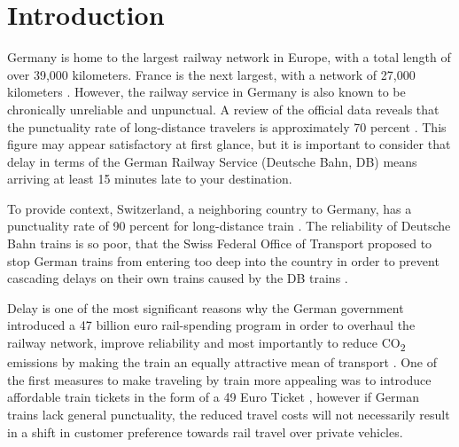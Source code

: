 \documentclass[12pt,a4paper]{article}
\title{\mytitle}
\author{Fabian Becker}
\date{\today}
\begin{document}
    
    
\maketitle

\begin{abstract}
    The goal of this document is to demonstrate how to write a scientific paper. We walk through the process of outlining, writing, formatting in \LaTeX, making figures, referencing, and checking style and content. Source files are available at: \url{http://hoffman.physics.harvard.edu/example-paper/}.
\end{abstract}

\section{\label{sec:Start}Introduction}

Germany is home to the largest railway network in Europe, with a total length of over 39,000 kilometers. France is the next largest, with a network of 27,000 kilometers \citep[p.80]{RailwayLengthStat}. 
However, the railway service in Germany is also known to be chronically unreliable and unpunctual. 
A review of the official data reveals that the punctuality rate of long-distance travelers is approximately 70 percent \citep{dpa2023, DBPunctuality2024}. 
This figure may appear satisfactory at first glance, but it is important to consider that delay in terms of the German Railway Service (Deutsche Bahn, DB) means arriving at least 15 minutes late to your destination.

To provide context, Switzerland, a neighboring country to Germany, has a punctuality rate of 90 percent for long-distance train \citep{SBB2024}. 
The reliability of Deutsche Bahn trains is so poor, that the Swiss Federal Office of Transport proposed to stop German trains from entering too deep into the country in order to prevent cascading delays on their own trains  caused by the DB trains \citep{Magill2023}.

Delay is one of the most significant reasons why the German government introduced a 47 billion euro rail-spending program in order to overhaul the railway network, improve reliability and most importantly to reduce CO\textsubscript{2} emissions by making the train an equally attractive mean of transport \citep{Scally2023}. 
One of the first measures to make traveling by train more appealing was to introduce affordable train tickets in the form of a 49 Euro Ticket \citep{DW2023}, however if German trains lack general punctuality, the reduced travel costs will not necessarily result in a shift in customer preference towards rail travel over private vehicles.
\end{document}
